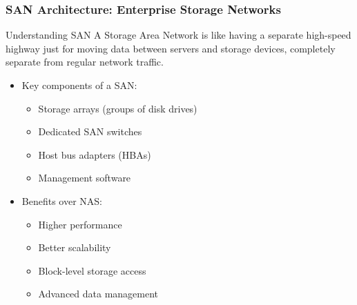 \documentclass{beamer}
\begin{document}
\begin{frame}
    \frametitle{SAN Architecture: Enterprise Storage Networks}
    
    \begin{block}{Understanding SAN}
        A Storage Area Network is like having a separate high-speed highway just for moving data between servers and storage devices, completely separate from regular network traffic.
    \end{block}
    
    \begin{itemize}
        \item Key components of a SAN:
        \begin{itemize}
            \item Storage arrays (groups of disk drives)
            \item Dedicated SAN switches
            \item Host bus adapters (HBAs)
            \item Management software
        \end{itemize}
        
        \item Benefits over NAS:
        \begin{itemize}
            \item Higher performance
            \item Better scalability
            \item Block-level storage access
            \item Advanced data management
        \end{itemize}
    \end{itemize}
\end{frame}
\end{document}
